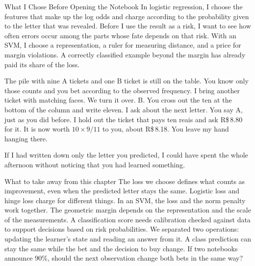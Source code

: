 \begin{quadro}{What I Chose Before Opening the Notebook}
 In logistic regression, I choose the features that make up the log odds and charge according to the probability given to the letter that was revealed. Before I use the result as a risk, I want to see how often errors occur among the parts whose fate depends on that risk.
 With an SVM, I choose a representation, a ruler for measuring distance, and a price for margin violations. A correctly classified example beyond the margin has already paid its share of the loss.
\end{quadro}

The pile with nine A tickets and one B ticket is still on the table. You know only those counts and you bet according to the observed frequency. I bring another ticket with matching faces. We turn it over. B. You cross out the ten at the bottom of the column and write eleven. I ask about the next letter. You say A, just as you did before. I hold out the ticket that pays ten reais and ask R\$\,8.80 for it. It is now worth $10\times9/11$ to you, about R\$\,8.18. You leave my hand hanging there.

If I had written down only the letter you predicted, I could have spent the whole afternoon without noticing that you had learned something.

\begin{quadro}{What to take away from this chapter}
 The loss we choose defines what counts as improvement, even when the predicted letter stays the same. Logistic loss and hinge loss charge for different things.
 In an SVM, the loss and the norm penalty work together. The geometric margin depends on the representation and the scale of the measurements.
 A classification score needs calibration checked against data to support decisions based on risk probabilities.
 We separated two operations: updating the learner's state and reading an answer from it. A class prediction can stay the same while the bet and the decision to buy change.
 If two notebooks announce $90\%$, should the next observation change both bets in the same way?
\end{quadro}
